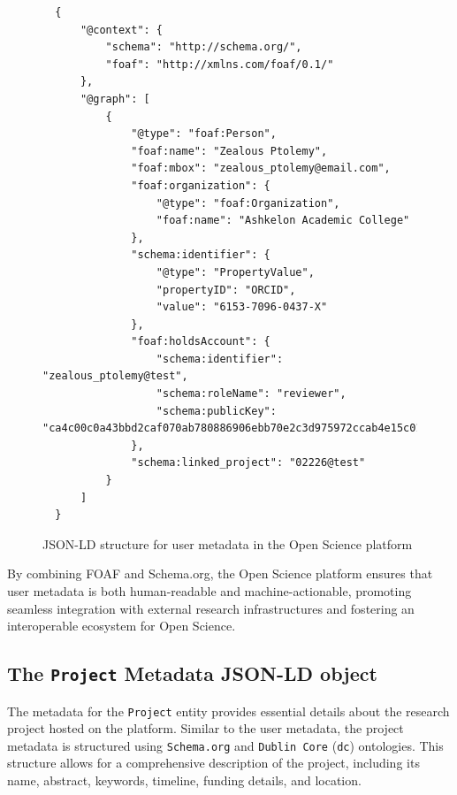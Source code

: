 \documentclass{article}
\begin{document}
\begin{figure}[h]
      \centering
      \caption{JSON-LD structure for user metadata in the Open Science platform}
      \label{jsonld:user}
      \begin{verbatim}
  {
      "@context": {
          "schema": "http://schema.org/",
          "foaf": "http://xmlns.com/foaf/0.1/"
      },
      "@graph": [
          {
              "@type": "foaf:Person",
              "foaf:name": "Zealous Ptolemy",
              "foaf:mbox": "zealous_ptolemy@email.com",
              "foaf:organization": {
                  "@type": "foaf:Organization",
                  "foaf:name": "Ashkelon Academic College"
              },
              "schema:identifier": {
                  "@type": "PropertyValue",
                  "propertyID": "ORCID",
                  "value": "6153-7096-0437-X"
              },
              "foaf:holdsAccount": {
                  "schema:identifier": "zealous_ptolemy@test",
                  "schema:roleName": "reviewer",
                  "schema:publicKey": "ca4c00c0a43bbd2caf070ab780886906ebb70e2c3d975972ccab4e15c01f33bd"
              },
              "schema:linked_project": "02226@test"
          }
      ]
  }
  \end{verbatim}
\end{figure}



By combining FOAF and Schema.org, the Open Science platform ensures that user metadata is both human-readable and machine-actionable, promoting seamless integration with external research infrastructures and fostering an interoperable ecosystem for Open Science.

\subsection{The \texttt{Project} Metadata JSON-LD object}

The metadata for the \texttt{Project} entity provides essential details about the research project hosted on the platform. Similar to the user metadata, the project metadata is structured using \texttt{Schema.org} and \texttt{Dublin Core} (\texttt{dc}) ontologies. This structure allows for a comprehensive description of the project, including its name, abstract, keywords, timeline, funding details, and location.
\end{document}
